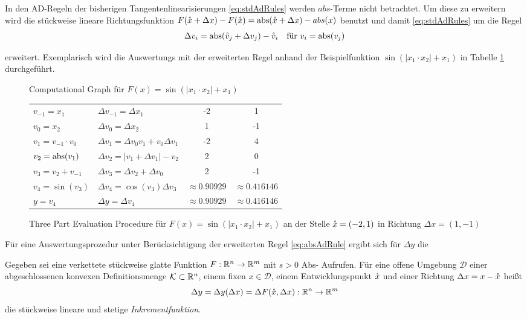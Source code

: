 In den AD-Regeln der bisherigen Tangentenlinearisierungen \eqref{eq:stdAdRules} werden $abs$-Terme nicht betrachtet. Um diese zu erweitern wird
die stückweise lineare Richtungsfunktion $F(\mathring{x} + \Delta x) - F(\mathring{x}) = \operatorname{abs}(\mathring{x}+\Delta x) - abs(x)$ benutzt und damit \eqref{eq:stdAdRules} um die Regel
\begin{equation}
\label{eq:absAdRule}
\begin{aligned}
 \Delta v_i &= \operatorname{abs}(\mathring{v}_j+ \Delta v_j) - \mathring{v}_i &\text{für } v_i = \operatorname{abs}(v_j)
 \end{aligned}
\end{equation}

erweitert. Exemplarisch wird die Auswertungs mit der erweiterten Regel anhand der Beispielfunktion $\sin(|x_1\cdot x_2|+x_1)$ in Tabelle \ref{fig:computationalGraphTable} durchgeführt.
\begin{figure}
\centering
 
 \caption{Computational Graph für $F(x) = \sin(|x_1\cdot x_2|+x_1)$}
\label{fig:computationalGraph} 
 \begin{tabular}{|l|l||c|c|}
 \hline
 $v_{-1} =  x_1$ 		&$\Delta v_{-1} = \Delta x_1$ & -2 & 1	\\
 $v_{0} =  x_2$ 		&$\Delta v_{0} = \Delta x_2$&1 &-1	\\
 \hline
 $v_{1} = v_{-1}\cdot v_{0}$ 	&$\Delta v_{1} = \Delta v_{0}v_1 + v_0 \Delta v_{1}$&-2&4\\
 $v_{2} =  \operatorname{abs}(v_{1})$		&$\Delta v_{2} =  |v_1 + \Delta v_1| - v_2$&2&0\\
 $v_{3} =  v_2+v_{-1}$ 		&$\Delta v_{3} = \Delta v_2 + \Delta v_0$&2&-1\\
 $v_{4} =  \sin(v_{3})$ 	&$\Delta v_{4} = \cos(v_3) \Delta v_3$&$\approx 0.90929$& $\approx 0.416146$ \\
 \hline
 $y =  v_{4}$ & $\Delta y = \Delta v_4$&$\approx 0.90929$& $\approx 0.416146$ \\
 \hline
\end{tabular}
\caption{Three Part Evaluation Procedure für $F(x) = \sin(|x_1\cdot x_2|+x_1)$ an der Stelle $\mathring{x} = (-2,1)$ in Richtung $\Delta x = (1,-1)$}
\label{fig:computationalGraphTable}
\end{figure}
Für eine Auswertungsprozedur unter Berücksichtigung der erweiterten Regel \eqref{eq:absAdRule} ergibt sich für $\Delta y$ \cite[S.9]{monster} die
\begin{definition}[Inkrementfunktion]
\label{def:incrementFunction}
Gegeben sei eine verkettete stückweise glatte Funktion $F:\mathbb{R}^n\to\mathbb{R}^m$ mit $s>0$ Abs- Aufrufen. Für eine offene Umgebung $\mathcal D$ einer abgeschlossenen konvexen Definitionsmenge $\mathcal K \subset \mathbb{R}^n$, einem fixen $x\in \mathcal D$, einem Entwicklungspunkt $\mathring{x}$ und einer Richtung $\Delta x = x-\mathring{x}$ heißt 
\[
\Delta y = \Delta y (\Delta x) = \Delta F(\mathring{x},\Delta x):\mathbb{R}^n \to \mathbb{R}^m
\]
die stückweise lineare und stetige \textit{Inkrementfunktion}.
\end{definition}

